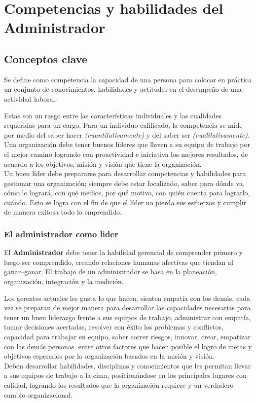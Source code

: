 \documentclass[letterpaper,12pt]{article}
\begin{document}
\begin{sloppypar}
\section{\textcolor[rgb]{0.4,0.4,0.9}{Competencias y habilidades del Administrador}}
\subsection{Conceptos clave}
Se define como competencia la capacidad de una persona para colocar en práctica un conjunto de conocimientos, habilidades y actitudes en el desempeño de una actividad laboral.

Estas son un rasgo entre las características individuales y las cualidades requeridas para un cargo. Para un individuo calificado, la competencia se mide por medio del saber hacer \textit{(cuantitativamente)} y del saber ser \textit{(cualitativamente).} Una organización debe tener buenos líderes que lleven a su equipo de trabajo por el mejor camino logrando con proactividad e iniciativa los mejores resultados, de acuerdo a los objetivos, misión y visión que tiene la organización.
\vspace{0.3cm}\\ 
Un buen líder debe prepararse para desarrollar competencias y habilidades para gestionar una organización; siempre debe estar focalizado, saber para dónde va, cómo lo logrará, con qué medios, por qué motivo, con quién cuenta para lograrlo, cuándo. Esto se logra con el fin de que el líder no pierda sus esfuerzos y cumplir de manera exitosa todo lo emprendido.
\subsubsection{El administrador como lider}
El \textbf{Administrador} debe tener la habilidad gerencial de comprender primero y luego ser comprendido, creando relaciones humanas afectivas que tiendan al ganar–ganar. El trabajo de un administrador se basa en la planeación, organización, integración y la medición.

Los gerentes actuales les gusta lo que hacen, sienten empatía con los demás, cada vez se preparan de mejor manera para desarrollar las capacidades necesarias para tener un buen liderazgo frente a sus equipos de trabajo, administrar con empatía, tomar decisiones acertadas, resolver con éxito los problemas y conflictos, capacidad para trabajar en equipo, saber correr riesgos, innovar, crear, empatizar con las demás personas, entre otros factores que hacen posible el logro de metas y objetivos esperados por la organización basados en la misión y visión. 
\vspace{0.3cm}\\ 
Deben desarrollar habilidades, disciplinas y conocimientos que les permitan llevar a sus equipos de trabajo a la cima, posicionándose en los principales lugares con calidad, logrando los resultados que la organización requiere y un verdadero cambio organizacional. 
\newpage

\end{sloppypar}
\end{document}
